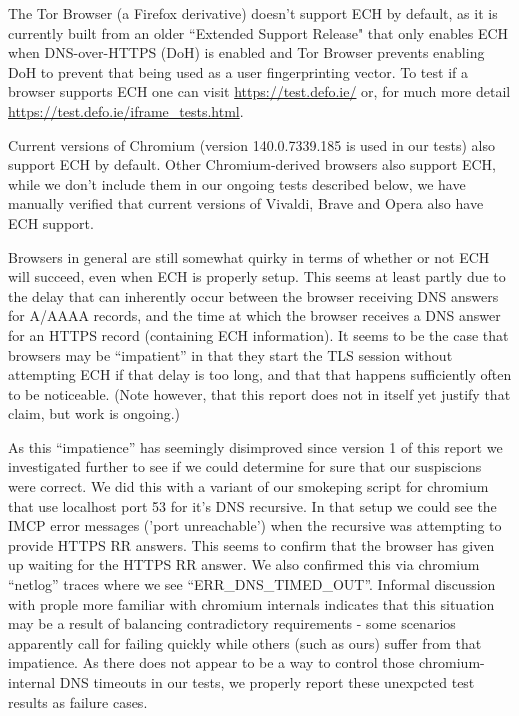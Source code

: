 The Tor Browser (a Firefox derivative) doesn't support ECH by default, as it
is currently built from an older ``Extended Support Release" that only
enables ECH when DNS-over-HTTPS (DoH) is enabled and Tor Browser prevents
enabling DoH to prevent that being used as a user fingerprinting vector.
To test if a browser supports ECH one can visit \url{https://test.defo.ie/}
or, for much more detail \url{https://test.defo.ie/iframe_tests.html}.

Current versions of Chromium (version 140.0.7339.185 is used in our tests)
also support ECH by default.
Other Chromium-derived browsers also support ECH, while we don't include them
in our ongoing tests described below, we have manually verified that current
versions of Vivaldi, Brave and Opera also have ECH support.

Browsers in general are still somewhat quirky in terms of whether or not
ECH will succeed, even when ECH is properly setup. This seems at least
partly due to the delay that can inherently occur between the browser
receiving DNS answers for A/AAAA records, and the time at which the
browser receives a DNS answer for an HTTPS record (containing ECH
information). It seems to be the case that browsers may be ``impatient''
in that they start the TLS session without attempting ECH if that
delay is too long, and that that happens sufficiently often to be
noticeable. (Note however, that this report does not in itself yet
justify that claim, but work is ongoing.)

As this ``impatience'' has seemingly disimproved since version 1 of
this report we investigated further to see if we could determine for
sure that our suspiscions were correct. We did this with a variant
of our smokeping script for chromium that use localhost port 53 for
it's DNS recursive. In that setup we could see the IMCP error messages
('port unreachable') when the recursive was attempting to provide HTTPS RR answers.
This seems to confirm that the browser has given up waiting for the HTTPS
RR answer. We also confirmed this via chromium ``netlog'' traces where
we see ``ERR\_DNS\_TIMED\_OUT''. Informal discussion with prople more
familiar with chromium internals indicates that this situation may be
a result of balancing contradictory requirements - some scenarios 
apparently call for failing quickly while others (such as ours) suffer
from that impatience. As there does not appear to be a way to control
those chromium-internal DNS timeouts in our tests, we properly report
these unexpcted test results as failure cases.

